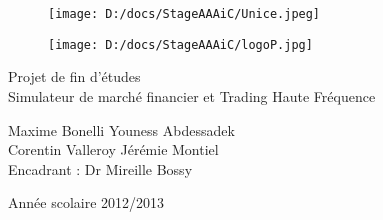 \documentclass[a4paper,10pt]{article}
\begin{document}
\begin{titlepage}

\begin{figure}[h!t]



\begin{minipage}[c]{.46\linewidth}
      \texttt{[image: D:/docs/StageAAAiC/Unice.jpeg]}
   \end{minipage} \hfill 
   \begin{minipage}[c]{.30\linewidth}
      \texttt{[image: D:/docs/StageAAAiC/logoP.jpg]}
   \end{minipage}
   
\end{figure}
\vspace{5cm}

\begin{center}

\LARGE{{Projet de fin d'études\\
Simulateur de marché financier et Trading Haute Fréquence} }
\vspace{0.5cm}

\vspace{0.5cm}
\large{{Maxime Bonelli \quad Youness Abdessadek\\Corentin Valleroy \quad Jérémie Montiel} \\
\vspace{2cm}
   {Encadrant : Dr Mireille Bossy\\
   }
   
 \vspace{0.5cm}

   
   \begin{center}


\vspace{0.5cm}
 {Année scolaire 2012/2013}

\end{center}
}\end{center}

\end{titlepage}


\begin{abstract}


Le but de ce rapport est de mettre en évidence les résultats obtenus durant le projet de fin d'études effectuée dans le cadre du master IMAFA à l'école Polytech Nice-Sophia. Les travaux, encadrés par le Dr Mireille Bossy, consistaient à implémenter des stratégies de trading haute fréquence (HFT) sur un simulateur de marché financier, à l’aide du langage de programmation C++.
\\		

Ce document se compose de trois parties principales. En premier lieu l'organisation du projet est présentée. Le modèle utilisé pour simuler le marché est ensuite exposé. Enfin, les stratégies de HFT implémentées sont l'objet de la dernière partie.
\end{abstract}
\end{document}
